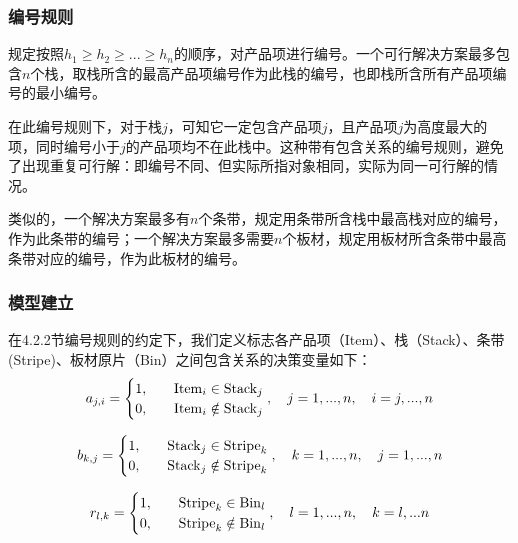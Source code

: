 \documentclass[bwprint]{gmcmthesis}
\begin{document}
\subsubsection{编号规则}
规定按照$h_1 \geq h_2 \geq ...\geq h_n$的顺序，对产品项进行编号。一个可行解决方案最多包含$n$个栈，取栈所含的最高产品项编号作为此栈的编号，也即栈所含所有产品项编号的最小编号。

在此编号规则下，对于栈$j$，可知它一定包含产品项$j$，且产品项$j$为高度最大的项，同时编号小于$j$的产品项均不在此栈中。这种带有包含关系的编号规则，避免了出现重复可行解：即编号不同、但实际所指对象相同，实际为同一可行解的情况。

类似的，一个解决方案最多有$n$个条带，规定用条带所含栈中最高栈对应的编号，作为此条带的编号；一个解决方案最多需要$n$个板材，规定用板材所含条带中最高条带对应的编号，作为此板材的编号。


\subsubsection{模型建立}
在4.2.2节编号规则的约定下，我们定义标志各产品项（Item）、栈（Stack）、条带(Stripe)、板材原片（Bin）之间包含关系的决策变量如下：
\begin{equation}   %
    a_{j,i}=
    \begin{cases}
        1, \quad  &  {\rm Item}_i \in   {\rm Stack}_j \\
        0,\quad  &  {\rm Item}_i  \notin   {\rm Stack}_j \\
    \end{cases},\quad j=1,...,n, \quad i=j,...,n  \label{决策变量定义a}
\end{equation}

\begin{equation}
    b_{k,j}=
    \begin{cases}
        1, \quad  &  {\rm Stack}_j \in   {\rm Stripe}_k \\
        0,\quad  &  {\rm Stack}_j  \notin   {\rm Stripe}_k \\
    \end{cases},\quad k=1,...,n, \quad j=1,...,n \label{决策变量定义b}
\end{equation}

\begin{equation}
    r_{l,k}=
    \begin{cases}
        1, \quad  &  {\rm Stripe}_k \in   {\rm Bin}_l \\
        0,\quad  &  {\rm Stripe}_k  \notin   {\rm Bin}_l \\
    \end{cases},\quad l=1,...,n, \quad k=l,...n \label{决策变量定义r}
\end{equation}
\end{document}
